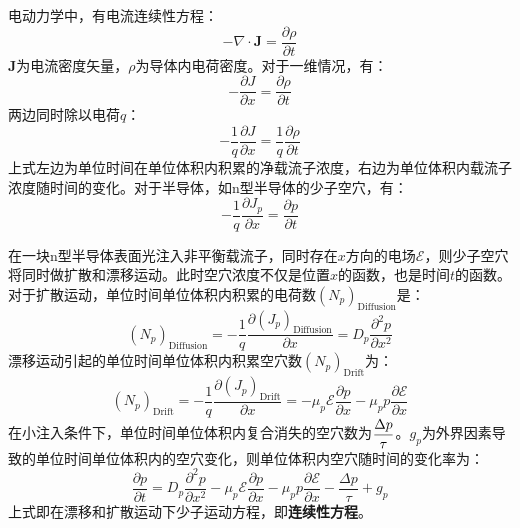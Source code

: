 电动力学中，有电流连续性方程：
\begin{equation}
    -\nabla\cdot \bm J=\frac{\partial \rho}{\partial t}
\end{equation}
$\bm J$为电流密度矢量，$\rho$为导体内电荷密度。对于一维情况，有：
\begin{equation}
    -\frac{\partial J}{\partial x}=\frac{\partial \rho}{\partial t}
\end{equation}
两边同时除以电荷$q$：
\begin{equation}
    -\frac{1}{q}\frac{\partial J}{\partial x}=\frac{1}{q}\frac{\partial \rho}{\partial t}
\end{equation}
上式左边为单位时间在单位体积内积累的净载流子浓度，右边为单位体积内载流子浓度随时间的变化。对于半导体，如n型半导体的少子空穴，有：
\begin{equation}
    -\frac{1}{q}\frac{\partial J_p}{\partial x}=\frac{\partial p}{\partial t}
\end{equation}

在一块n型半导体表面光注入非平衡载流子，同时存在$x$方向的电场$\mathscr{E}$，则少子空穴将同时做扩散和漂移运动。此时空穴浓度不仅是位置$x$的函数，也是时间$t$的函数。对于扩散运动，单位时间单位体积内积累的电荷数$(N_p)_\text{Diffusion}$是：
\begin{equation}
    (N_p)_\text{Diffusion}=-\frac{1}{q}\frac{\partial (J_p)_\text{Diffusion}}{\partial x}=D_p\frac{\partial^2 p}{\partial x^2}
\end{equation}
漂移运动引起的单位时间单位体积内积累空穴数$(N_p)_\text{Drift}$为：
\begin{equation}
    (N_p)_\text{Drift}=-\frac{1}{q}\frac{\partial (J_p)_\text{Drift}}{\partial x}=-\mu_p\mathscr{E}\frac{\partial p}{\partial x}-\mu_p p\frac{\partial \mathscr{E}}{\partial x}
\end{equation}
在小注入条件下，单位时间单位体积内复合消失的空穴数为$\displaystyle \frac{\Delta p}{\tau}$。$g_p$为外界因素导致的单位时间单位体积内的空穴变化，则单位体积内空穴随时间的变化率为：
\begin{equation}
    \frac{\partial p}{\partial t}=D_p\frac{\partial^2 p}{\partial x^2}-\mu_p\mathscr{E}\frac{\partial p}{\partial x}-\mu_p p\frac{\partial \mathscr{E}}{\partial x}-\frac{\Delta p}{\tau}+g_p
\end{equation}
上式即在漂移和扩散运动下少子运动方程，即\textbf{连续性方程}。\vspace{1ex}

